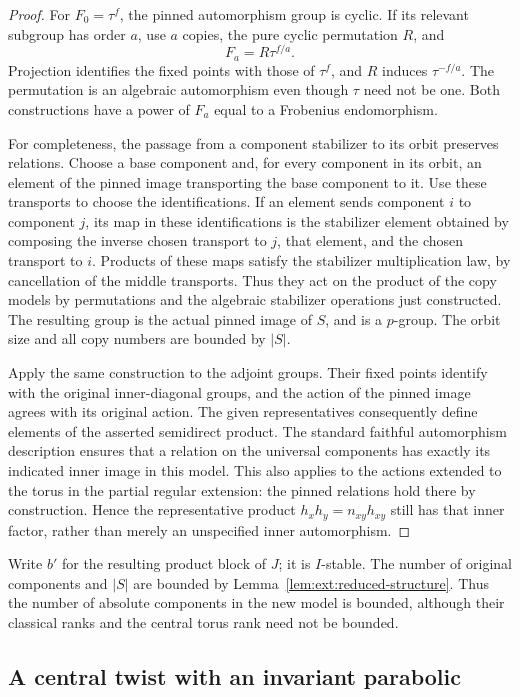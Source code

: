 \begin{proof}
For $F_0=\tau^f$, the pinned automorphism group is cyclic.  If its
relevant subgroup has order $a$, use $a$ copies, the pure cyclic
permutation $R$, and
\[
 F_a=R\tau^{f/a}.
\]
Projection identifies the fixed points with those of $\tau^f$, and
$R$ induces $\tau^{-f/a}$.  The permutation is an algebraic
automorphism even though $\tau$ need not be one.  Both constructions
have a power of $F_a$ equal to a Frobenius endomorphism.

For completeness, the passage from a component stabilizer to its
orbit preserves relations.  Choose a base component and, for every
component in its orbit, an element of the pinned image transporting
the base component to it.  Use these transports to choose the
identifications.  If an element sends component $i$ to component $j$,
its map in these identifications is the stabilizer element obtained
by composing the inverse chosen transport to $j$, that element, and
the chosen transport to $i$.  Products of these maps satisfy the
stabilizer multiplication law, by cancellation of the middle
transports.  Thus they act on the product of the copy models by
permutations and the algebraic stabilizer operations just constructed.
The resulting group is the actual pinned image of $S$, and is a
$p$-group.  The orbit size and all copy numbers are bounded by $|S|$.

Apply the same construction to the adjoint groups.  Their fixed points
identify with the original inner-diagonal groups, and the action of
the pinned image agrees with its original action.  The given
representatives consequently define elements of the asserted
semidirect product.  The standard faithful automorphism description
ensures that a relation on the universal components has exactly its
indicated inner image in this model.  This also applies to the actions
extended to the torus in the partial regular extension: the pinned
relations hold there by construction.  Hence the representative
product $h_xh_y=n_{xy}h_{xy}$ still has that inner factor, rather than
merely an unspecified inner automorphism.
\end{proof}

Write $b'$ for the resulting product block of $J$; it is $I$-stable.
The number of original components and $|S|$ are bounded by
Lemma~\ref{lem:ext:reduced-structure}.  Thus the number of absolute
components in the new model is bounded, although their classical
ranks and the central torus rank need not be bounded.

\subsection{A central twist with an invariant parabolic}

